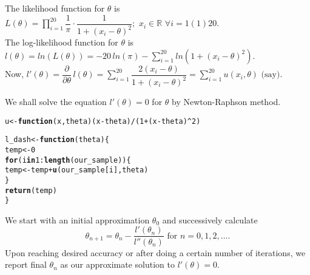 \documentclass[11pt, a4paper]{article}\usepackage[]{graphicx}\usepackage[]{xcolor}
\makeatletter
\newcommand{\hlnum}[1]{\textcolor[rgb]{0.686,0.059,0.569}{#1}}%
\newcommand{\hlopt}[1]{\textcolor[rgb]{0,0,0}{#1}}%
\newcommand{\hldef}[1]{\textcolor[rgb]{0.345,0.345,0.345}{#1}}%
\newcommand{\hlkwa}[1]{\textcolor[rgb]{0.161,0.373,0.58}{\textbf{#1}}}%
\newcommand{\hlkwb}[1]{\textcolor[rgb]{0.69,0.353,0.396}{#1}}%
\newcommand{\hlkwc}[1]{\textcolor[rgb]{0.333,0.667,0.333}{#1}}%
\newcommand{\hlkwd}[1]{\textcolor[rgb]{0.737,0.353,0.396}{\textbf{#1}}}%
\newenvironment{kframe}{%
 \def\at@end@of@kframe{}%
 \ifinner\ifhmode%
  \def\at@end@of@kframe{\end{minipage}}%
  \begin{minipage}{\columnwidth}%
 \fi\fi%
 \def\FrameCommand##1{\hskip\@totalleftmargin \hskip-\fboxsep
 \colorbox{shadecolor}{##1}\hskip-\fboxsep
     \hskip-\linewidth \hskip-\@totalleftmargin \hskip\columnwidth}%
 \MakeFramed {\advance\hsize-\width
   \@totalleftmargin\z@ \linewidth\hsize
   \@setminipage}}%
 {\par\unskip\endMakeFramed%
 \at@end@of@kframe}
\newenvironment{knitrout}{}{} %
\makeatother
\begin{document}
The likelihood function for $\theta$ is $L(\theta) = \prod \limits_{i = 1}^{20} \dfrac{1}{\pi} \cdot \dfrac{1}{1 + (x_i - \theta)^2}; \,\, x_i \in \mathbb{R} \,\, \forall i = 1(1)20$. \\

The log-likelihood function for $\theta$ is $l(\theta) = ln (L(\theta)) = -20 \, ln (\pi) - \sum \limits_{i = 1}^{20} ln (1 + (x_i - \theta)^2)$. \\

Now, $l'(\theta) = \dfrac{\partial}{\partial \theta} \, l(\theta) = \sum \limits_{i = 1}^{20} \dfrac{2(x_i - \theta)}{1 + (x_i - \theta)^2} = \sum \limits_{i = 1}^{20} u(x_i, \theta) \,\, \text{(say)}$. \\

\vspace{0.2cm}

We shall solve the equation $l'(\theta) = 0$ for $\theta$ by Newton-Raphson method. 
\begin{knitrout}
\color{fgcolor}\begin{kframe}
\begin{alltt}
\hldef{u} \hlkwb{<-} \hlkwa{function}\hldef{(}\hlkwc{x}\hldef{,} \hlkwc{theta}\hldef{) (x} \hlopt{-} \hldef{theta)}\hlopt{/}\hldef{(}\hlnum{1} \hlopt{+} \hldef{(x} \hlopt{-} \hldef{theta)}\hlopt{^}\hlnum{2}\hldef{)}
\end{alltt}
\end{kframe}
\end{knitrout}

\begin{knitrout}
\color{fgcolor}\begin{kframe}
\begin{alltt}
\hldef{l_dash} \hlkwb{<-} \hlkwa{function}\hldef{(}\hlkwc{theta}\hldef{)\{}
  \hldef{temp} \hlkwb{<-} \hlnum{0}
  \hlkwa{for} \hldef{(i} \hlkwa{in} \hlnum{1}\hlopt{:}\hlkwd{length}\hldef{(our_sample)) \{}
    \hldef{temp} \hlkwb{<-} \hldef{temp} \hlopt{+} \hlkwd{u}\hldef{(our_sample[i], theta)}
  \hldef{\}}
  \hlkwd{return}\hldef{(temp)}
\hldef{\}}
\end{alltt}
\end{kframe}
\end{knitrout}

We start with an initial approximation $\theta_0$ and successively calculate $$\theta_{n+1} = \theta_n - \dfrac{l'(\theta_n)}{l''(\theta_n)} \,\, \text{for} \,\, n = 0, 1, 2, \ldots.$$ Upon reaching desired accuracy or after doing a certain number of iterations, we report final $\theta_n$ as our approximate solution to $l'(\theta) = 0$. \\
\end{document}
